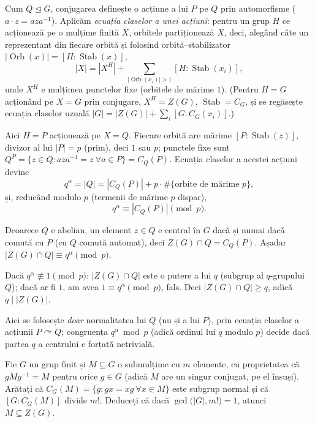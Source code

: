 \begin{solutie}
Cum $Q\trianglelefteq G$, conjugarea definește o acțiune a lui $P$ pe
$Q$ prin automorfisme ($a\cdot z=aza^{-1}$). Aplicăm \emph{ecuația
claselor a unei acțiuni}: pentru un grup $H$ ce acționează pe o
mulțime finită $X$, orbitele partiționează $X$, deci, alegând
câte un reprezentant din fiecare orbită și folosind
orbită--stabilizator $|\!\operatorname{Orb}(x)|=[H:\operatorname{Stab}(x)]$,
\[
  |X|=|X^{H}|+\sum_{|\operatorname{Orb}(x_i)|>1}[H:\operatorname{Stab}(x_i)],
\]
unde $X^{H}$ e mulțimea punctelor fixe (orbitele de mărime $1$).
(Pentru $H=G$ acționând pe $X=G$ prin conjugare, $X^{H}=Z(G)$,
$\operatorname{Stab}=C_G$, și se regăsește ecuația claselor
uzuală $|G|=|Z(G)|+\sum_i[G:C_G(x_i)]$.)

Aici $H=P$ acționează pe $X=Q$. Fiecare orbită are mărime
$[P:\operatorname{Stab}(z)]$, divizor al lui $|P|=p$ (prim), deci $1$ sau $p$;
punctele fixe sunt $Q^{P}=\{z\in Q: aza^{-1}=z\ \forall a\in P\}=C_{Q}(P)$.
Ecuația claselor a acestei acțiuni devine
\[
  q^{\alpha}=|Q|=|C_{Q}(P)|+p\cdot\#\{\text{orbite de mărime }p\},
\]
și, reducând modulo $p$ (termenii de mărime $p$ dispar),
\[
  q^{\alpha}\equiv|C_{Q}(P)|\pmod p .
\]

Deoarece $Q$ e abelian, un element $z\in Q$ e central în $G$ dacă
și numai dacă comută cu $P$ (cu $Q$ comută automat), deci
$Z(G)\cap Q=C_{Q}(P)$. Așadar
$|Z(G)\cap Q|\equiv q^{\alpha}\pmod p$.

Dacă $q^{\alpha}\not\equiv 1\pmod p$: $|Z(G)\cap Q|$ este o putere a lui
$q$ (subgrup al $q$-grupului $Q$); dacă ar fi $1$, am avea
$1\equiv q^{\alpha}\pmod p$, fals. Deci $|Z(G)\cap Q|\ge q$, adică
$q\mid|Z(G)|$.
\end{solutie}

\begin{obs}
Aici se folosește \emph{doar} normalitatea lui $Q$ (nu și a lui $P$),
prin ecuația claselor a acțiunii $P\curvearrowright Q$; congruența
$q^{\alpha}\bmod p$ (adică ordinul lui $q$ modulo $p$) decide dacă
partea $q$ a centrului e forțată netrivială.
\end{obs}

\begin{problema}
Fie $G$ un grup finit și $M\subseteq G$ o submulțime cu $m$ elemente,
cu proprietatea că $gMg^{-1}=M$ pentru orice $g\in G$ (adică $M$ are
un singur conjugat, pe el însuși). Arătați că
$C_{G}(M)=\{g:gx=xg\ \forall x\in M\}$ este subgrup normal și că
$[G:C_{G}(M)]$ divide $m!$. Deduceți că dacă
$\gcd\bigl(|G|,m!\bigr)=1$, atunci $M\subseteq Z(G)$.
\end{problema}

